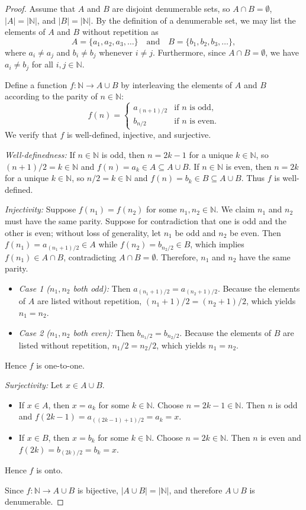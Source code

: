 \documentclass[11pt, letterpaper]{article}
\theoremstyle{definition}
\theoremstyle{remark}
\begin{document}
\begin{proof}
Assume that $A$ and $B$ are disjoint denumerable sets, so $A \cap B = \emptyset$, $|A| = |\mathbb{N}|$, and $|B| = |\mathbb{N}|$. By the definition of a denumerable set, we may list the elements of $A$ and $B$ without repetition as
\[
A = \{a_1, a_2, a_3, \dots\} \quad \text{and} \quad B = \{b_1, b_2, b_3, \dots\},
\]
where $a_i \neq a_j$ and $b_i \neq b_j$ whenever $i \neq j$. Furthermore, since $A \cap B = \emptyset$, we have $a_i \neq b_j$ for all $i, j \in \mathbb{N}$.

Define a function $f : \mathbb{N} \to A \cup B$ by interleaving the elements of $A$ and $B$ according to the parity of $n \in \mathbb{N}$:
\[
f(n) = \begin{cases}
a_{(n+1)/2} & \text{if } n \text{ is odd}, \\[4pt]
b_{n/2} & \text{if } n \text{ is even}.
\end{cases}
\]
We verify that $f$ is well-defined, injective, and surjective.

\emph{Well-definedness:} If $n \in \mathbb{N}$ is odd, then $n = 2k - 1$ for a unique $k \in \mathbb{N}$, so $(n+1)/2 = k \in \mathbb{N}$ and $f(n) = a_k \in A \subseteq A \cup B$. If $n \in \mathbb{N}$ is even, then $n = 2k$ for a unique $k \in \mathbb{N}$, so $n/2 = k \in \mathbb{N}$ and $f(n) = b_k \in B \subseteq A \cup B$. Thus $f$ is well-defined.

\emph{Injectivity:} Suppose $f(n_1) = f(n_2)$ for some $n_1, n_2 \in \mathbb{N}$. We claim $n_1$ and $n_2$ must have the same parity. Suppose for contradiction that one is odd and the other is even; without loss of generality, let $n_1$ be odd and $n_2$ be even. Then $f(n_1) = a_{(n_1+1)/2} \in A$ while $f(n_2) = b_{n_2/2} \in B$, which implies $f(n_1) \in A \cap B$, contradicting $A \cap B = \emptyset$. Therefore, $n_1$ and $n_2$ have the same parity.
\begin{itemize}
    \item \emph{Case 1 ($n_1, n_2$ both odd):} Then $a_{(n_1+1)/2} = a_{(n_2+1)/2}$. Because the elements of $A$ are listed without repetition, $(n_1 + 1)/2 = (n_2 + 1)/2$, which yields $n_1 = n_2$.
    \item \emph{Case 2 ($n_1, n_2$ both even):} Then $b_{n_1/2} = b_{n_2/2}$. Because the elements of $B$ are listed without repetition, $n_1/2 = n_2/2$, which yields $n_1 = n_2$.
\end{itemize}
Hence $f$ is one-to-one.

\emph{Surjectivity:} Let $x \in A \cup B$.
\begin{itemize}
    \item If $x \in A$, then $x = a_k$ for some $k \in \mathbb{N}$. Choose $n = 2k - 1 \in \mathbb{N}$. Then $n$ is odd and $f(2k - 1) = a_{((2k-1)+1)/2} = a_k = x$.
    \item If $x \in B$, then $x = b_k$ for some $k \in \mathbb{N}$. Choose $n = 2k \in \mathbb{N}$. Then $n$ is even and $f(2k) = b_{(2k)/2} = b_k = x$.
\end{itemize}
Hence $f$ is onto.

Since $f : \mathbb{N} \to A \cup B$ is bijective, $|A \cup B| = |\mathbb{N}|$, and therefore $A \cup B$ is denumerable.
\end{proof}
\end{document}
